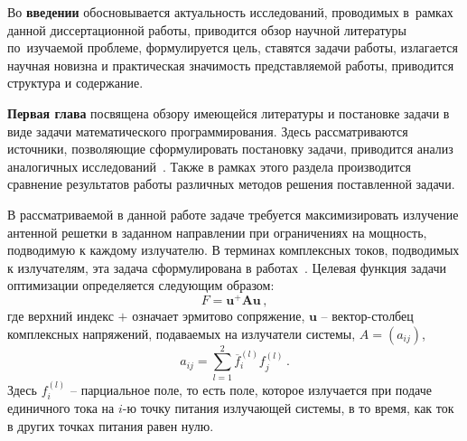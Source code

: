 Во {\textbf{введении}} обосновывается актуальность
исследований, проводимых в~рамках данной диссертационной работы,
приводится обзор научной литературы по~изучаемой проблеме,
формулируется цель, ставятся задачи работы, излагается научная новизна
и практическая значимость представляемой работы, приводится структура и содержание.

{\textbf{Первая глава}} посвящена обзору имеющейся литературы и постановке задачи в виде задачи математического программирования. Здесь рассматриваются источники, позволяющие сформулировать постановку задачи, приводится анализ аналогичных исследований~. Также в рамках этого раздела производится сравнение результатов работы различных методов решения поставленной задачи.

В рассматриваемой в данной работе задаче требуется максимизировать излучение антенной решетки в заданном направлении при ограничениях на мощность, подводимую к каждому излучателю. В терминах комплексных токов, подводимых к излучателям, эта задача сформулирована в работах~. Целевая функция задачи оптимизации определяется следующим образом:
%
    \begin{equation}
        F = \textbf{u}^{+}\textbf{Au} \, ,
        \label{eq:F_0}
    \end{equation}
%
где верхний индекс $+$ означает эрмитово сопряжение, $\textbf{u}$ -- вектор-столбец комплексных напряжений, подаваемых на излучатели системы, $A = (a_{ij})$,
%
     \begin{equation}
        a_{ij} = \sum_{l=1}^2\overline{f}_{i}^{(l)}f_{j}^{(l)}
        \label{eq:A_0} \, .
    \end{equation}
%
Здесь $f_i^{(l)}$ -- парциальное поле, то есть поле, которое излучается при подаче единичного тока на $i$-ю точку питания излучающей системы, в то время, как ток в других точках питания равен нулю.

